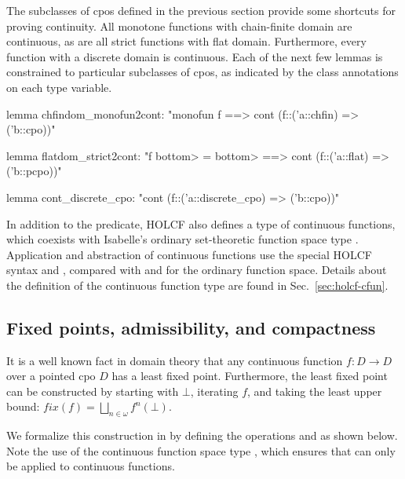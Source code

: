 The subclasses of cpos defined in the previous section provide some shortcuts for proving continuity. All monotone functions with chain-finite domain are continuous, as are all strict functions with flat domain. Furthermore, every function with a discrete domain is continuous. Each of the next few lemmas is constrained to particular subclasses of cpos, as indicated by the class annotations on each type variable.

\begin{isacode}
lemma chfindom_monofun2cont:
  "monofun f ==> cont (f::('a::chfin) => ('b::cpo))"
\end{isacode}
\unmedskip
{}
\begin{isacode}
lemma flatdom_strict2cont:
  "f \<bottom> = \<bottom> ==> cont (f::('a::flat) => ('b::pcpo))"
\end{isacode}
\unmedskip
{}
\begin{isacode}
lemma cont_discrete_cpo:
  "cont (f::('a::discrete_cpo) => ('b::cpo))"
\end{isacode}

In addition to the  predicate, HOLCF also defines a type  of continuous functions, which coexists with Isabelle's ordinary set-theoretic function space type . Application and abstraction of continuous functions use the special HOLCF syntax  and , compared with  and  for the ordinary function space. Details about the definition of the continuous function type are found in Sec.~\ref{sec:holcf-cfun}.

\subsection{Fixed points, admissibility, and compactness}
\label{sec:holcf-fix}

It is a well known fact in domain theory that any continuous function $f : D \to D$ over a pointed cpo $D$ has a least fixed point. Furthermore, the least fixed point can be constructed by starting with $\bot$, iterating $f$, and taking the least upper bound: $\mathit{fix}(f) = \bigsqcup_{n\in\omega} f^n(\bot)$.

We formalize this construction in  by defining the operations  and  as shown below. Note the use of the continuous function space type , which ensures that  can only be applied to continuous functions.

